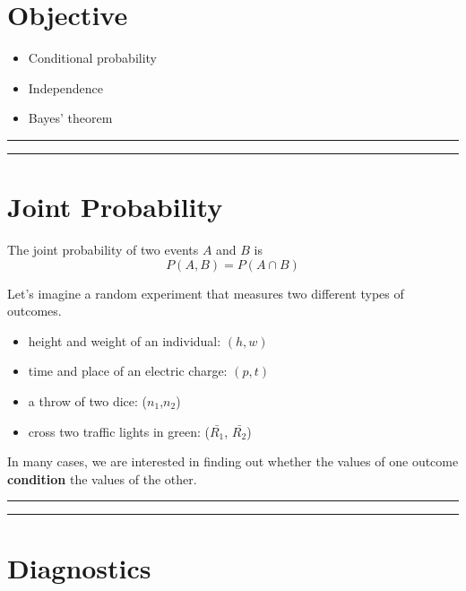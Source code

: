 \documentclass[
]{book}
\providecommand{\tightlist}{%
  \setlength{\itemsep}{0pt}\setlength{\parskip}{0pt}}
\begin{document}
\hypertarget{objective-2}{%
\section{Objective}\label{objective-2}}

\begin{itemize}
\tightlist
\item
  Conditional probability
\item
  Independence
\item
  Bayes' theorem
\end{itemize}

\begin{center}\rule{0.5\linewidth}{0.5pt}\end{center}

\begin{center}\rule{0.5\linewidth}{0.5pt}\end{center}

\hypertarget{joint-probability}{%
\section{Joint Probability}\label{joint-probability}}

The joint probability of two events \(A\) and \(B\) is
\[P(A,B)=P(A \cap B)\]

Let's imagine a random experiment that measures two different types of outcomes.

\begin{itemize}
\item
  height and weight of an individual: \((h, w)\)
\item
  time and place of an electric charge: \((p, t)\)
\item
  a throw of two dice: (\(n_1\),\(n_2\))
\item
  cross two traffic lights in green: (\(\bar{R_1}\), \(\bar{R_2}\))
\end{itemize}

In many cases, we are interested in finding out whether the values of one outcome \textbf{condition} the values of the other.

\begin{center}\rule{0.5\linewidth}{0.5pt}\end{center}

\begin{center}\rule{0.5\linewidth}{0.5pt}\end{center}

\hypertarget{diagnostics}{%
\section{Diagnostics}\label{diagnostics}}
\end{document}
